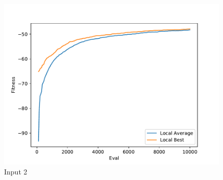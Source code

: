\documentclass{standalone}
\begin{document}
\begin{figure}[!htb]
	\caption{Input 2}
	\label{fig:graph_2022}
	\includegraphics[width=\textwidth]{../graphs/graphs/2022.pdf}
\end{figure}
\end{document}
